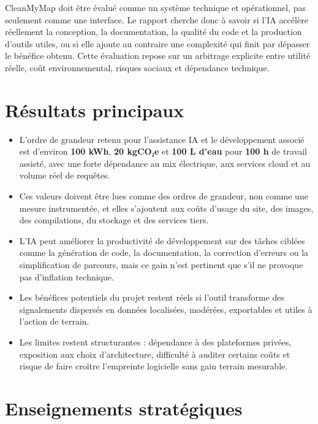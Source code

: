 \documentclass[
  10pt,
  a4paper,
  DIV=11,
  numbers=noendperiod,
  oneside]{scrreprt}
\providecommand{\tightlist}{%
  \setlength{\itemsep}{0pt}\setlength{\parskip}{0pt}}
\let\oldtextbf\textbf
\renewcommand{\textbf}[1]{\oldtextbf{\textcolor{cmmnavy}{#1}}}
\begin{document}
CleanMyMap doit être évalué comme un système technique et opérationnel,
pas seulement comme une interface. Le rapport cherche donc à savoir si
l'IA accélère réellement la conception, la documentation, la qualité du
code et la production d'outils utiles, ou si elle ajoute au contraire
une complexité qui finit par dépasser le bénéfice obtenu. Cette
évaluation repose sur un arbitrage explicite entre utilité réelle, coût
environnemental, risques sociaux et dépendance technique.

\section{Résultats principaux}\label{ruxe9sultats-principaux}

\begin{itemize}
\tightlist
\item
  L'ordre de grandeur retenu pour l'assistance IA et le développement
  associé est d'environ \textbf{100 kWh}, \textbf{20 kgCO₂e} et
  \textbf{100 L d'eau} pour \textbf{100 h} de travail assisté, avec une
  forte dépendance au mix électrique, aux services cloud et au volume
  réel de requêtes.
\item
  Ces valeurs doivent être lues comme des ordres de grandeur, non comme
  une mesure instrumentée, et elles s'ajoutent aux coûts d'usage du
  site, des images, des compilations, du stockage et des services tiers.
\item
  L'IA peut améliorer la productivité de développement sur des tâches
  ciblées comme la génération de code, la documentation, la correction
  d'erreurs ou la simplification de parcours, mais ce gain n'est
  pertinent que s'il ne provoque pas d'inflation technique.
\item
  Les bénéfices potentiels du projet restent réels si l'outil transforme
  des signalements dispersés en données localisées, modérées,
  exportables et utiles à l'action de terrain.
\item
  Les limites restent structurantes : dépendance à des plateformes
  privées, exposition aux choix d'architecture, difficulté à auditer
  certains coûts et risque de faire croître l'empreinte logicielle sans
  gain terrain mesurable.
\end{itemize}

\section{Enseignements
stratégiques}\label{enseignements-stratuxe9giques}
\end{document}
